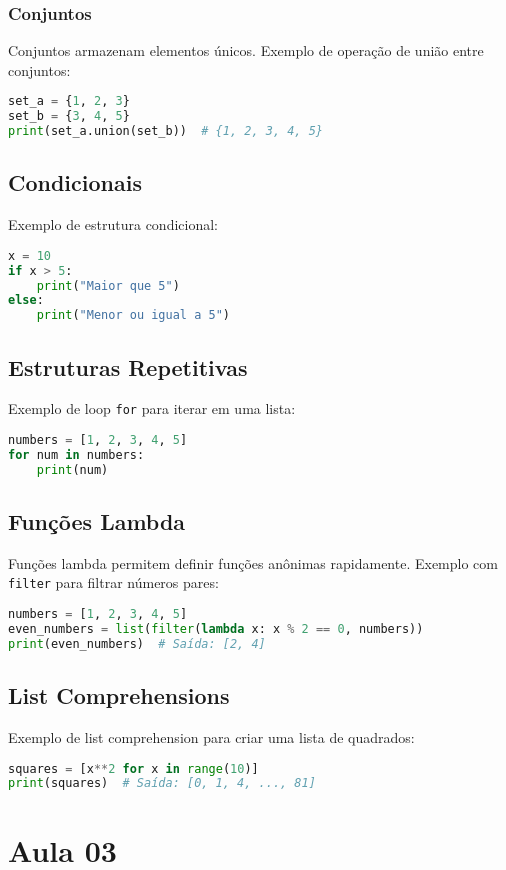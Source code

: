 \documentclass{sciposter}
\begin{document}
\begin{multicols}{3}
\subsubsection{Conjuntos}
Conjuntos armazenam elementos únicos. Exemplo de operação de união entre conjuntos:
\begin{lstlisting}[language=Python]
set_a = {1, 2, 3}
set_b = {3, 4, 5}
print(set_a.union(set_b))  # {1, 2, 3, 4, 5}
\end{lstlisting}

\subsection{Condicionais}
Exemplo de estrutura condicional:
\begin{lstlisting}[language=Python]
x = 10
if x > 5:
    print("Maior que 5")
else:
    print("Menor ou igual a 5")
\end{lstlisting}

\subsection{Estruturas Repetitivas}
Exemplo de loop \texttt{for} para iterar em uma lista:
\begin{lstlisting}[language=Python]
numbers = [1, 2, 3, 4, 5]
for num in numbers:
    print(num)
\end{lstlisting}

\subsection{Funções Lambda}
Funções lambda permitem definir funções anônimas rapidamente. Exemplo com \texttt{filter} para filtrar números pares:
\begin{lstlisting}[language=Python]
numbers = [1, 2, 3, 4, 5]
even_numbers = list(filter(lambda x: x % 2 == 0, numbers))
print(even_numbers)  # Saída: [2, 4]
\end{lstlisting}

\subsection{List Comprehensions}
Exemplo de list comprehension para criar uma lista de quadrados:
\begin{lstlisting}[language=Python]
squares = [x**2 for x in range(10)]
print(squares)  # Saída: [0, 1, 4, ..., 81]
\end{lstlisting}

\section{Aula 03}


\end{multicols}
\end{document}
